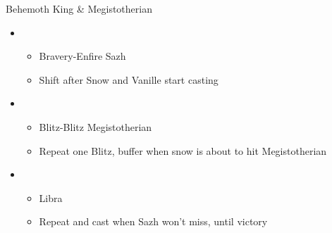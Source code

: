 \begin{battle}[0:26]{Behemoth King \& Megistotherian}
	\begin{itemize}
		\item \fifth
		      \begin{itemize}
			      \item Bravery-Enfire Sazh
			      \item Shift after Snow and Vanille start casting
		      \end{itemize}
		\item \second
		      \begin{itemize}
			      \item Blitz-Blitz Megistotherian
			      \item Repeat one Blitz, buffer when snow is about to hit Megistotherian
		      \end{itemize}
		\item \fourth
		      \begin{itemize}
		      	     \item Libra
			      \item Repeat and cast when Sazh won't miss, until victory
		      \end{itemize}
	\end{itemize}
\end{battle}

